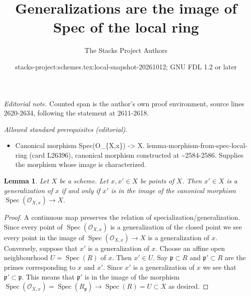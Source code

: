 \documentclass{stacks-project}
\title{Generalizations are the image of Spec of the local ring}
\author{The Stacks Project Authors}
\date{stacks-project:schemes.tex:local-snapshot-20261012; GNU FDL 1.2 or later}
\theoremstyle{plain}
\newtheorem{lemma}[subsection]{Lemma}
\theoremstyle{definition}
\theoremstyle{remark}
\numberwithin{equation}{subsection}
\def\Spec{\mathop{\mathrm{Spec}}}
\begin{document}
\maketitle
\noindent\textit{Editorial note.} Counted span is the author's own proof environment, source lines 2620-2634, following the statement at 2611-2618.\par\medskip
\noindent\textit{Allowed standard prerequisites (editorial).}\begin{itemize}
\item Canonical morphism Spec(O\_\{X,x\}) -> X. lemma-morphism-from-spec-local-ring (card L26396), canonical morphism constructed at \textasciitilde{}2584-2586. Supplies the morphism whose image is characterized.
\end{itemize}\medskip
\begin{lemma}
\label{lemma-specialize-points}
Let $X$ be a scheme.
Let $x, x' \in X$ be points of $X$.
Then $x' \in X$ is a generalization of $x$ if and only if
$x'$ is in the image of the canonical morphism
$\Spec(\mathcal{O}_{X, x}) \to X$.
\end{lemma}

\begin{proof}
A continuous map preserves the relation of specialization/generalization.
Since every point of $\Spec(\mathcal{O}_{X, x})$ is a
generalization of the closed point we see every point in the image
of $\Spec(\mathcal{O}_{X, x}) \to X$ is a generalization of $x$.
Conversely, suppose that $x'$ is a generalization of $x$.
Choose an affine open neighbourhood $U = \Spec(R)$ of
$x$. Then $x' \in U$. Say $\mathfrak p \subset R$ and
$\mathfrak p' \subset R$ are the primes corresponding
to $x$ and $x'$. Since $x'$ is a generalization of $x$
we see that $\mathfrak p' \subset \mathfrak p$. This means
that $\mathfrak p'$ is in the image of the morphism
$\Spec(\mathcal{O}_{X, x}) = \Spec(R_{\mathfrak p})
\to \Spec(R) = U \subset X$ as desired.
\end{proof}
\end{document}
